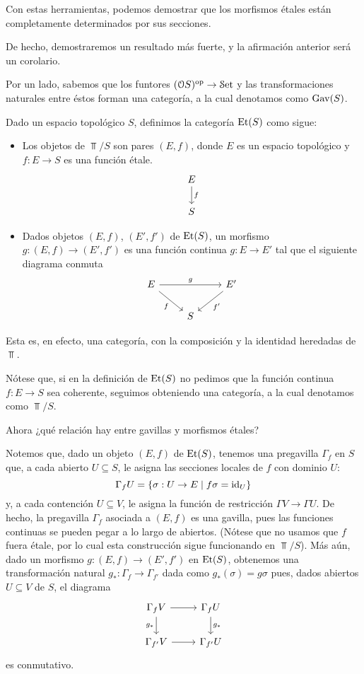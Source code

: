 Con estas herramientas,
podemos demostrar que los morfismos étales
están completamente determinados por sus secciones.

De hecho, demostraremos un resultado más fuerte,
y la afirmación anterior será un corolario.

Por un lado, sabemos que los funtores $(\mathcal{O}S)^{\mathrm{op}}\to\mathcal{S}\mathrm{et}$
y las transformaciones naturales entre éstos
forman una categoría, a la cual denotamos como $\operatorname{Gav}(S)$.

\begin{definition}
    Dado un espacio topológico $S$, definimos la categoría
    $\operatorname{Et}(S)$ como sigue:
    \begin{itemize}
        \item
        Los objetos de $\Top/S$ son pares $(E,f)$,
        donde $E$ es un espacio topológico
        y $f:E\to S$ es una función étale.
        \[
            \begin{tikzcd}
                E \ar[d,"f"] \\ S
            \end{tikzcd}
        \]
        \item
        Dados objetos $(E,f)$, $(E',f')$ de $\operatorname{Et}(S)$,
        un morfismo $g:(E,f)\to(E',f')$ es una función
        continua $g:E\to E'$ tal que el siguiente diagrama conmuta
        \[
            \begin{tikzcd}
                E \ar[dr,"f"'] \ar[rr,"g"] && E' \ar[dl,"f'"]
                \\ & S
            \end{tikzcd}
        \]
    \end{itemize}
    Esta es, en efecto, una categoría,
    con la composición y la identidad
    heredadas de $\Top$.
    
    Nótese que, si en la definición de $\operatorname{Et}(S)$
    no pedimos que la función continua $f:E\to S$ sea coherente,
    seguimos obteniendo una categoría,
    a la cual denotamos como $\Top/S$.
\end{definition}

Ahora ¿qué relación hay entre gavillas y morfismos étales?

Notemos que, dado un objeto $(E,f)$ de $\operatorname{Et}(S)$,
tenemos una pregavilla $\Gamma_f$ en $S$ que,
a cada abierto $U\subseteq S$, le asigna las secciones locales
de $f$ con dominio $U$:
\[
    \Gamma_f U = \{\sigma:U\to E\mid f\sigma = \mathrm{id}_U\}
\]
y, a cada contención $U\subseteq V$, le asigna
la función de restricción $\Gamma V\to\Gamma U$.
De hecho, la pregavilla $\Gamma_f$ asociada a $(E,f)$ es una gavilla,
pues las funciones continuas se pueden pegar a lo largo de abiertos.
(Nótese que no usamos que $f$ fuera étale, por lo cual esta
construcción sigue funcionando en $\Top/S$).
Más aún, dado un morfismo $g:(E,f)\to(E',f')$ en $\operatorname{Et}(S)$,
obtenemos una transformación natural $g_*:\Gamma_f\to\Gamma_{f'}$
dada como $g_*(\sigma)=g\sigma$ pues,
dados abiertos $U\subseteq V$ de $S$, el diagrama
\[
    \begin{tikzcd}
        \Gamma_fV \ar[d,"g_*"'] \ar[r] & \Gamma_fU \ar[d,"g_*"] \\
        \Gamma_{f'}V \ar[r] & \Gamma_{f'}U
    \end{tikzcd}
\]
es conmutativo.

